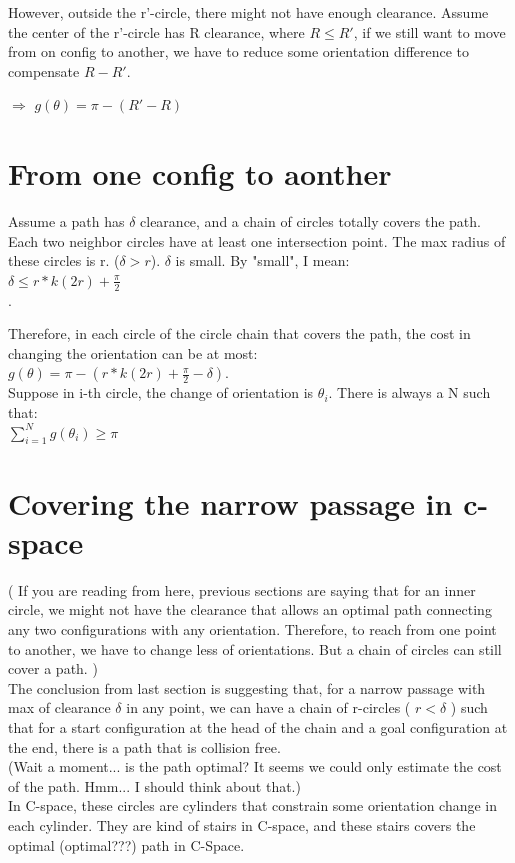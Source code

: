 \documentclass[12pt]{article}
\begin{document}
  However, outside the r'-circle, there might not have enough clearance. Assume the center of the r'-circle has R clearance, where $R \leq R' $, if we still want to move from on config to another, we have to reduce some orientation difference to compensate $R-R'$.

  $\Longrightarrow$ $g(\theta) = \pi - (R'-R)$ \\

  \section{From one config to aonther}

  Assume a path has $\delta$ clearance, and a chain of circles totally covers the path. Each two neighbor circles have at least one intersection point. The max radius of these circles is r. ($\delta > r$). $\delta$ is small. By "small", I mean:\\

  $\delta \leq r*k(2r) + \frac{\pi}{2}$\\.

  Therefore, in each circle of the circle chain that covers the path, the cost in changing the orientation can be at most:\\

  $g(\theta) = \pi - ( r*k(2r) + \frac{\pi}{2} - \delta)$.\\

  Suppose in i-th circle, the change of orientation is $\theta_{i}$. There is always a N such that:\\

  $\sum\limits_{i = 1}^N g(\theta_{i}) \geq \pi$\\

  \section{Covering the narrow passage in c-space}

  ( If you are reading from here, previous sections are saying that for an inner circle, we might not have the clearance that allows an optimal path connecting any two configurations with any orientation. Therefore, to reach from one point to another, we have to change less of orientations. But a chain of circles can still cover a path. )\\

  The conclusion from last section is suggesting that, for a narrow passage with max of clearance $\delta$ in any point, we can have a chain of r-circles ( $r < \delta$ ) such that for a start configuration at the head of the chain and a goal configuration at the end, there is a path that is collision free.\\

  (Wait a moment... is the path optimal? It seems we could only estimate the cost of the path. Hmm... I should think about that.)\\

  In C-space, these circles are cylinders that constrain some orientation change in each cylinder. They are kind of stairs in C-space, and these stairs covers the optimal (optimal???) path in C-Space. \\
\end{document}

